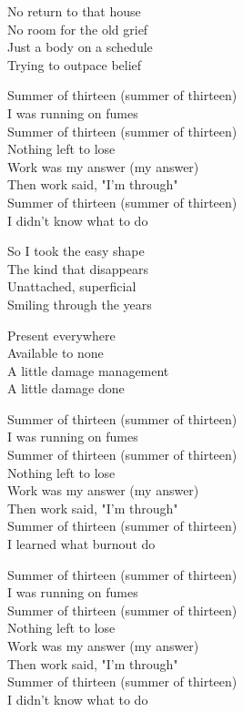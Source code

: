 \begin{lyrics}
No return to that house\\
No room for the old grief\\
Just a body on a schedule\\
Trying to outpace belief

Summer of thirteen (summer of thirteen)\\
I was running on fumes\\
Summer of thirteen (summer of thirteen)\\
Nothing left to lose\\
Work was my answer (my answer)\\
Then work said, "I’m through"\\
Summer of thirteen (summer of thirteen)\\
I didn’t know what to do

So I took the easy shape\\
The kind that disappears\\
Unattached, superficial\\
Smiling through the years

Present everywhere\\
Available to none\\
A little damage management\\
A little damage done

Summer of thirteen (summer of thirteen)\\
I was running on fumes\\
Summer of thirteen (summer of thirteen)\\
Nothing left to lose\\
Work was my answer (my answer)\\
Then work said, "I’m through"\\
Summer of thirteen (summer of thirteen)\\
I learned what burnout do

Summer of thirteen (summer of thirteen)\\
I was running on fumes\\
Summer of thirteen (summer of thirteen)\\
Nothing left to lose\\
Work was my answer (my answer)\\
Then work said, "I’m through"\\
Summer of thirteen (summer of thirteen)\\
I didn’t know what to do
\end{lyrics}

